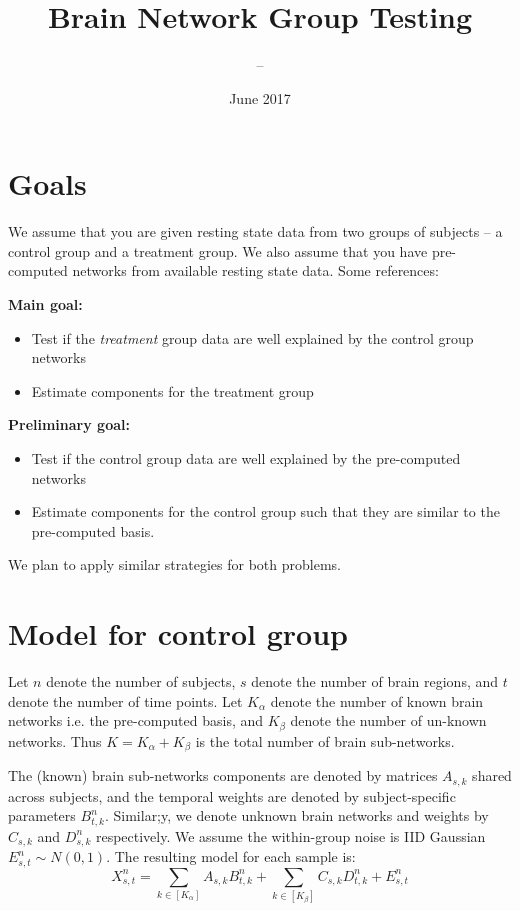 \documentclass{article}
\title{Brain Network Group Testing}
\author{--}
\date{June 2017}
\begin{document}
\maketitle
\section{Goals}
We assume that you are given resting state data from two groups of subjects -- a control group and a treatment group. We also assume that you have pre-computed networks from available resting state data.
Some references: \citep{varoquaux_brain_2010, belilovsky_learning_2016, belilovsky_testing_2016}

{\bf Main goal:}
\begin{itemize}
    \item Test if the {\em treatment} group data are well explained by the control group networks
    \item Estimate components for the treatment group
\end{itemize}

{\bf Preliminary goal:}
\begin{itemize}
    \item Test if the control group data are well explained by the pre-computed networks
    \item Estimate components for the control group such that they are similar to the pre-computed basis.
\end{itemize}
We plan to apply similar strategies for both problems.

\section{Model for control group}
Let $n$ denote the number of subjects, $s$ denote the number of brain regions, and $t$ denote the number of time points. Let $K_\alpha$ denote the number of known brain networks i.e. the pre-computed basis, and $K_\beta$ denote the number of un-known networks. Thus $K = K_\alpha + K_\beta$ is the total number of brain sub-networks.

The (known) brain sub-networks components are denoted by matrices $A_{s, k}$ shared across subjects, and the temporal weights are denoted by subject-specific parameters $B^n_{t, k}$. Similar;y, we denote unknown brain networks and weights by $C_{s, k}$ and $D^n_{s, k}$ respectively. We assume the within-group noise is IID Gaussian $E^{n}_{s,t} \sim N(0, 1)$. The resulting model for each sample is:
\begin{equation}
X^{n}_{s,t} = \sum_{k \in [K_\alpha]} A_{s, k} B^n_{t, k} + \sum_{k \in [K_\beta]} C_{s, k} D^n_{t, k} + E^{n}_{s,t}
\end{equation}
\end{document}
